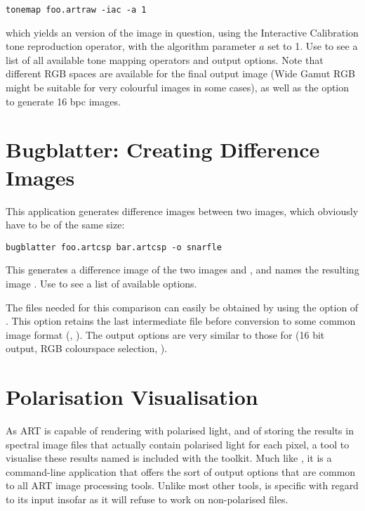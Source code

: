 \begin{verbatim}
tonemap foo.artraw -iac -a 1 
\end{verbatim}

which yields an  version of the  image in
question, using the Interactive Calibration tone reproduction operator, with the algorithm parameter $a$ set to 1. Use  to see a list of all available tone mapping operators and output options. Note that different RGB spaces are available for the final output image (Wide Gamut RGB might be suitable for very colourful images in some cases), as well as the option to generate 16 bpc  images.

\section{Bugblatter: Creating Difference Images}
\label{sec:using:bugblatter}

This application generates difference images between two  images, which obviously have to be of the same size:

\begin{verbatim}
bugblatter foo.artcsp bar.artcsp -o snarfle
\end{verbatim}

This generates a difference image of the two images  and , and names the resulting image . Use  to see a list of available options.

The  files needed for this comparison can easily be obtained by using the  option of . This option retains the last intermediate  file before conversion to some common image format (, ). The output options are very similar to those for  (16 bit output, RGB colourspace selection, \etc).

\section{Polarisation Visualisation}
As ART is capable of rendering with polarised light, and of storing the results in spectral image files that actually contain polarised light for each pixel, a tool to visualise these results named  is included with the toolkit. Much like , it is a command-line application that offers the sort of output options that are common to all ART image processing tools. Unlike most other tools,  is specific with regard to its input insofar as it will refuse to work on non-polarised  files.

